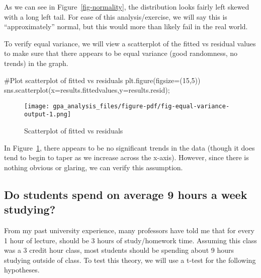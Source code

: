 \documentclass[
  letterpaper,
  DIV=11,
  numbers=noendperiod]{scrreprt}
\newenvironment{Shaded}{\begin{snugshade}}{\end{snugshade}}
\newcommand{\CommentTok}[1]{\textcolor[rgb]{0.37,0.37,0.37}{#1}}
\newcommand{\DecValTok}[1]{\textcolor[rgb]{0.68,0.00,0.00}{#1}}
\newcommand{\NormalTok}[1]{\textcolor[rgb]{0.00,0.23,0.31}{#1}}
\newcommand{\OperatorTok}[1]{\textcolor[rgb]{0.37,0.37,0.37}{#1}}
\begin{document}
As we can see in Figure~\ref{fig-normality}, the distribution looks
fairly left skewed with a long left tail. For ease of this
analysis/exercise, we will say this is ``approximately'' normal, but
this would more than likely fail in the real world.

To verify equal variance, we will view a scatterplot of the fitted vs
residual values to make sure that there appears to be equal variance
(good randomness, no trends) in the graph.

\begin{Shaded}
\begin{Highlighting}[]
\CommentTok{\#Plot scatterplot of fitted vs residuals}
\NormalTok{plt.figure(figsize}\OperatorTok{=}\NormalTok{(}\DecValTok{15}\NormalTok{,}\DecValTok{5}\NormalTok{))}
\NormalTok{sns.scatterplot(x}\OperatorTok{=}\NormalTok{results.fittedvalues,y}\OperatorTok{=}\NormalTok{results.resid)}\OperatorTok{;}
\end{Highlighting}
\end{Shaded}

\begin{figure}[H]

{\centering \texttt{[image: gpa\_analysis\_files/figure-pdf/fig-equal-variance-output-1.png]}

}

\caption{\label{fig-equal-variance}Scatterplot of fitted vs residuals}

\end{figure}

In Figure~\ref{fig-equal-variance}, there appears to be no significant
trends in the data (though it does tend to begin to taper as we increase
across the x-axis). However, since there is nothing obvious or glaring,
we can verify this assumption.

\hypertarget{do-students-spend-on-average-9-hours-a-week-studying}{%
\subsection{Do students spend on average 9 hours a week
studying?}\label{do-students-spend-on-average-9-hours-a-week-studying}}

From my past university experience, many professors have told me that
for every 1 hour of lecture, should be 3 hours of study/homework time.
Assuming this class was a 3 credit hour class, most students should be
spending about 9 hours studying outside of class. To test this theory,
we will use a t-test for the following hypotheses.
\end{document}
